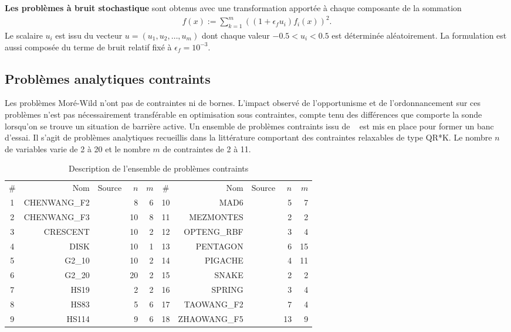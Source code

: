 \textbf{Les problèmes à bruit stochastique} sont obtenus avec une transformation apportée à chaque composante de la sommation 
\begin{gather*}
f(x):=\sum_{k=1}^{m}{{((1+\epsilon_f u_i)f_{i}(x))}^{2}}.
\end{gather*}
Le scalaire $u_i$ est issu du vecteur $u=(u_1,u_2,\dots,u_m)$ dont chaque valeur $-0.5<u_i<0.5$ est déterminée aléatoirement. La formulation est aussi composée du terme de bruit relatif fixé à $\epsilon_f = 10^{-3}$.
\subsection{Problèmes analytiques contraints}\label{sec:pac}
Les problèmes Moré-Wild n'ont pas de contraintes ni de bornes.  L'impact observé de l'opportunisme et de l'ordonnancement sur ces problèmes n'est pas nécessairement transférable en optimisation sous contraintes, compte tenu des différences que comporte la sonde lorsqu'on se trouve un situation de barrière active. Un ensemble de problèmes contraints issu de ~\cite{CoLed2011,AuTr17} est mis en place pour former un banc d'essai. Il s'agit de problèmes analytiques recueillis dans la littérature comportant des contraintes relaxables de type \textsf{QR*K}. Le nombre $n$ de variables varie de 2 à 20 et le nombre $m$ de contraintes de 2 à 11.
\begin{table}[h]
\centering
\begin{tabular}{||c r r r r||c r r r r||}
\hline
\# & Nom & Source & $n$ & $m$ & \# & Nom & Source & $n$ & $m$\\
\hhline{||=====||=====||}
1 & CHENWANG\_F2 & \cite{ChWa2010} & 8 & 6 & 10 & MAD6 & \cite{HoSc1981} & 5 & 7\\ 
2 & CHENWANG\_F3 & \cite{ChWa2010} & 10 & 8 & 11 & MEZMONTES & \cite{Montes2009} & 2 & 2\\ 
3 & CRESCENT & \cite{AuDe09a} & 10 & 2 & 12 & OPTENG\_RBF & \cite{KiArYa2011} & 3 & 4\\ 
4 & DISK & \cite{AuDe09a} & 10 & 1 & 13 & PENTAGON & \cite{LuVl00} & 6 & 15\\ 
5 & G2\_10 & \cite{AuDeLe08} & 10 & 2 & 14 & PIGACHE & \cite{PiMeNo2007} & 4 & 11\\ 
6 & G2\_20 & \cite{AuDeLe08} & 20 & 2 & 15 & SNAKE & \cite{HoSc1981} & 2 & 2\\ 
7 & HS19 & \cite{HoSc1981} &  2 & 2 & 16 & SPRING & \cite{AuDe09a} & 3 & 4\\ 
8 & HS83 & \cite{LuVl00} & 5 & 6 & 17 & TAOWANG\_F2 & \cite{TaWa08} & 7 & 4\\ 
9 & HS114 & \cite{HoSc1981} & 9 & 6 & 18 & ZHAOWANG\_F5 & \cite{ChWa2010b} & 13 & 9\\  
\hline
\end{tabular}
\caption{Description de l'ensemble de problèmes contraints}
\end{table}
